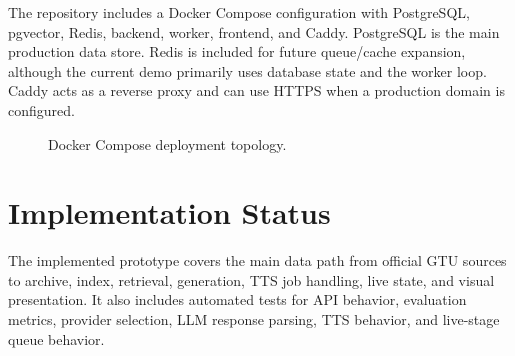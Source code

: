 The repository includes a Docker Compose configuration with PostgreSQL, pgvector, Redis, backend, worker, frontend, and Caddy. PostgreSQL is the main production data store. Redis is included for future queue/cache expansion, although the current demo primarily uses database state and the worker loop. Caddy acts as a reverse proxy and can use HTTPS when a production domain is configured.

\begin{figure}[!htbp]
    \centering
    \caption{\label{fig:deployment}Docker Compose deployment topology.}
\end{figure}

\section{Implementation Status}

The implemented prototype covers the main data path from official GTU sources to archive, index, retrieval, generation, TTS job handling, live state, and visual presentation. It also includes automated tests for API behavior, evaluation metrics, provider selection, LLM response parsing, TTS behavior, and live-stage queue behavior.
